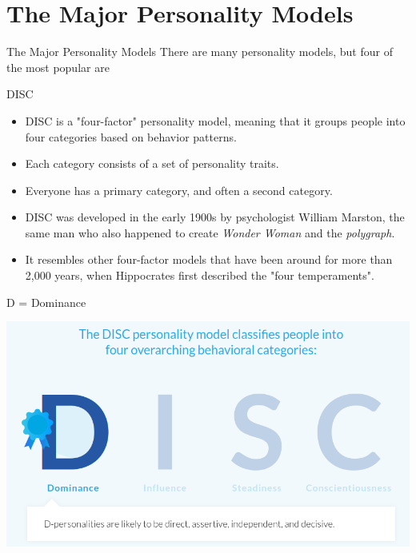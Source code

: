 \documentclass{beamer}
\theoremstyle{mystyle}
\begin{document}
\section{The Major Personality Models}
\begin{frame}{The Major Personality Models}
	There are many personality models, but four of the most popular \citep{crystal2015guide} are 
\end{frame}

\begin{frame}{DISC}
	\begin{itemize}
		\item<2-> DISC is a "four-factor" personality model, meaning that it groups people into four categories based on behavior patterns.
		\item<3-> Each category consists of a set of personality traits. 
		\item<4-> Everyone has a primary category, and often a second category.
		\item<5-> DISC was developed in the early 1900s by psychologist William Marston, the same man who also happened to create \textit{Wonder Woman} and the \textit{polygraph}. 
		\item<6-> It resembles other four-factor models that have been around for more than 2,000 years, when Hippocrates first described the "four temperaments". 
	\end{itemize}
\end{frame}

\begin{frame}{D = Dominance}
	\begin{center}
		\includegraphics[scale=.35]{images/d-of-disc}
	\end{center}
\end{frame}
\end{document}
